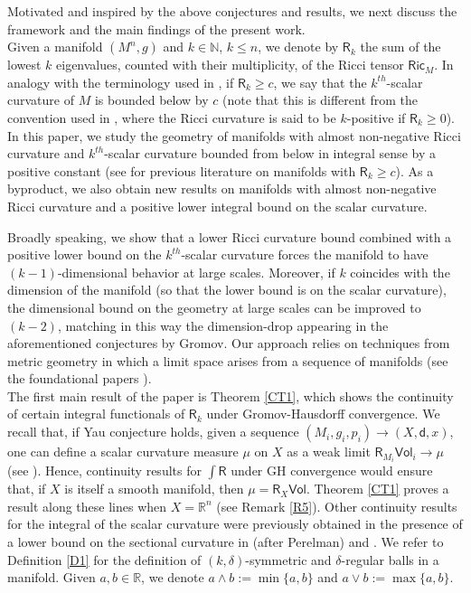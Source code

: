 \documentclass[10pt]{article}
\theoremstyle{definition}
\newcommand{\bb}[1]{\mathbb{#1}}
\newcommand{\ssf}[1]{\mathsf{#1}}
\newcommand{\Ric}{\mathsf{Ric}}
\newcommand{\sd}{\mathsf{d}}
\newcommand{\R}{\mathsf{R}}
\begin{document}
Motivated and inspired by the above conjectures and results, we next discuss the framework and the main findings of the present work.
\\
Given a manifold $(M^n,g)$ and $k \in \bb{N}$, $k \leq n$, we denote by $\R_k$ the sum of the lowest $k$ eigenvalues, counted with their multiplicity, of the Ricci tensor $\Ric_M$. In analogy with the terminology used in \cite{ShenKricci}, if $\R_k \geq c$, we say that the $k^{th}$-scalar curvature of $M$ is bounded below by $c$ (note that this is different from the convention used in \cite{WolfsonKricci}, where the Ricci curvature is said to be $k$-positive if $\R_k \geq 0$).
In this paper, we study the geometry of manifolds with almost non-negative Ricci curvature and $k^{th}$-scalar curvature bounded from below in integral sense by a positive constant (see \cite{Moull1,Moull2,Moull3,Moull4,Moull5} for previous literature on manifolds with $\R_k \geq c$).
As a byproduct, we also obtain new results on manifolds with almost non-negative Ricci curvature and a positive lower integral bound on the scalar curvature.

Broadly speaking, we show that a lower Ricci curvature bound combined with a positive lower bound on the $k^{th}$-scalar curvature forces the manifold to have $(k-1)$-dimensional behavior at large scales. Moreover, if $k$ coincides with the dimension of the manifold (so that the lower bound is on the scalar curvature), the dimensional bound on the geometry at large scales can be improved to $(k-2)$, matching in this way the dimension-drop appearing in the aforementioned conjectures by Gromov.
Our approach 
relies on techniques from metric geometry in which a limit space arises from a sequence of manifolds (see the foundational papers \cite{ChCo1, Colding1,ChcoStructure2,ChCo3}).
\\

The first main result of the paper is Theorem \ref{CT1}, which shows the continuity of certain integral functionals of $\R_k$ under Gromov-Hausdorff convergence. 
We recall that, if Yau conjecture holds, given a sequence $(M_i,g_i,p_i) \to (X,\sd,x)$,
one can define a scalar curvature measure $\mu$ on $X$ as a weak limit $\R_{M_i} \ssf{Vol}_i \to \mu$ (see \cite[Conjecture 2.18]{Naberconjectures}). Hence, continuity results for $\int \R$ under GH convergence would ensure that, if $X$ is itself a smooth manifold, then $\mu=\R_{X} \ssf{Vol}$. Theorem \ref{CT1} proves a result along these lines when $X=\bb{R}^n$ (see Remark \ref{R5}).
Other continuity results for the integral of the scalar curvature were previously obtained in the presence of a lower bound on the sectional curvature in \cite[Theorem B3]{PetruninPoli} (after Perelman) and \cite{lebedeva2022curvaturetensorsmoothablealexandrov}. 
We refer to Definition \ref{D1} for the definition of $(k,\delta)$-symmetric and $\delta$-regular balls in a manifold. Given $a,b \in \bb{R}$, we denote $a \wedge b:=\min\{a,b\}$ and $a \vee b:=\max\{a,b\}$.
\end{document}

